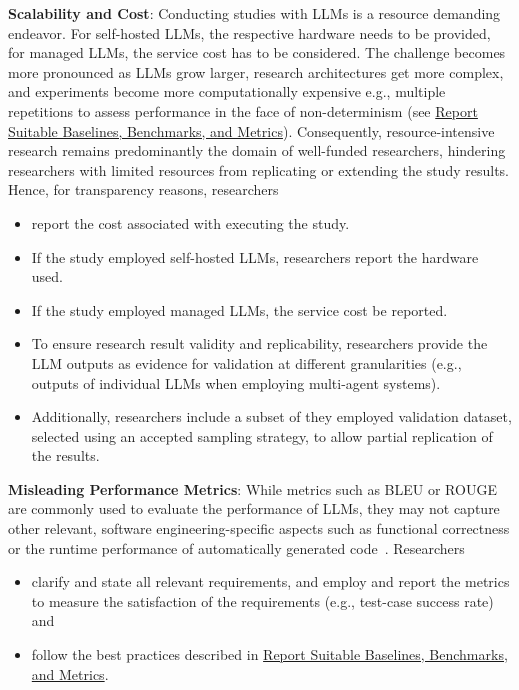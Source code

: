 \textbf{Scalability and Cost}:
Conducting studies with LLMs is a resource demanding endeavor. For self-hosted LLMs, the respective hardware needs to be provided, for managed LLMs, the service cost has to be considered. The challenge becomes more pronounced as LLMs grow larger, research architectures get more complex, and experiments become more computationally expensive e.g., multiple repetitions to assess performance in the face of non-determinism (see \href{/guidelines/report-baselines-benchmarks-and-metrics}{Report Suitable Baselines, Benchmarks, and Metrics}).
Consequently, resource-intensive research remains predominantly the domain of well-funded researchers, hindering researchers with limited resources from replicating or extending the study results. Hence, for transparency reasons, researchers
\begin{itemize}
  \item \should report the cost associated with executing the study. 
  \item If the study employed self-hosted LLMs, researchers \should report the hardware used. 
  \item If the study employed managed LLMs, the service cost \should be reported.
  \item To ensure research result validity and replicability, researchers \must provide the LLM outputs as evidence for validation at different granularities (e.g., outputs of individual LLMs when employing multi-agent systems).
  \item Additionally, researchers \should include a subset of they employed validation dataset, selected using an accepted sampling strategy, to allow partial replication of the results.
\end{itemize}

\textbf{Misleading Performance Metrics}:
While metrics such as BLEU or ROUGE are commonly used to evaluate the performance of LLMs, they may not capture other relevant, software engineering-specific aspects such as functional correctness or the runtime performance of automatically generated code~\cite{DBLP:conf/nips/LiuXW023}. Researchers
\begin{itemize}
  \item \should clarify and state all relevant requirements, and employ and report the metrics to measure the satisfaction of the requirements (e.g., test-case success rate) and
  \item \should follow the best practices described in \href{/guidelines/report-baselines-benchmarks-and-metrics}{Report Suitable Baselines, Benchmarks, and Metrics}.
\end{itemize}

